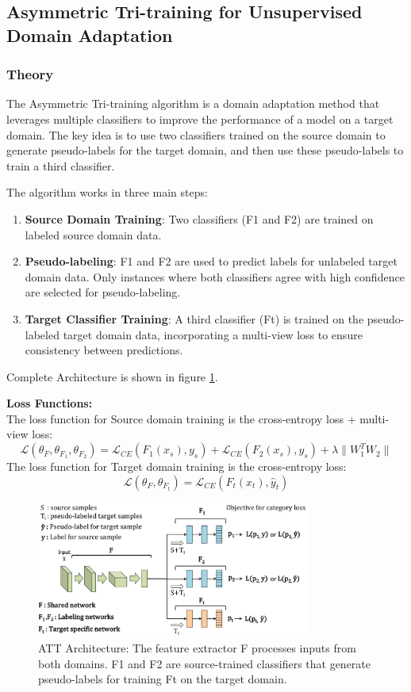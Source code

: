 \documentclass{article}
\begin{document}
\subsection*{Asymmetric Tri-training for Unsupervised Domain Adaptation}
\subsubsection*{Theory}
The Asymmetric Tri-training algorithm is a domain adaptation method that leverages multiple classifiers to improve the performance of a model on a target domain. The key idea is to use two classifiers trained on the source domain to generate pseudo-labels for the target domain, and then use these pseudo-labels to train a third classifier. 

The algorithm works in three main steps:

\begin{enumerate}
  \item \textbf{Source Domain Training}: Two classifiers (F1 and F2) are trained on labeled source domain data.
  
  \item \textbf{Pseudo-labeling}: F1 and F2 are used to predict labels for unlabeled target domain data. Only instances where both classifiers agree with high confidence are selected for pseudo-labeling.
  
  \item \textbf{Target Classifier Training}: A third classifier (Ft) is trained on the pseudo-labeled target domain data, incorporating a multi-view loss to ensure consistency between predictions.
\end{enumerate}

Complete Architecture is shown in figure \ref{fig:att_architecture}.

\textbf{Loss Functions:}\\
 The loss function for Source domain training is the cross-entropy loss + multi-view loss:
\[
  \mathcal{L}(\theta_F, \theta_{F_1}, \theta_{F_2}) = \mathcal{L}_{CE}(F_1(x_s), {y}_s) + 
  \mathcal{L}_{CE}(F_2(x_s), {y}_s) + \lambda
  \|W_1^T W_2\|
\]
The loss function for Target domain training is the cross-entropy loss:
\[
  \mathcal{L}(\theta_F, \theta_{F_t}) = \mathcal{L}_{CE}(F_t(x_t), \hat{y}_t)
\]

\begin{figure}
  \centering
  \includegraphics[width=0.8\textwidth]{ATT/ATT_Architecture.png}
  \caption{ATT Architecture: The feature extractor F processes inputs from both domains. F1 and F2 are source-trained classifiers that generate pseudo-labels for training Ft on the target domain.}
  \label{fig:att_architecture}
\end{figure}
\end{document}
